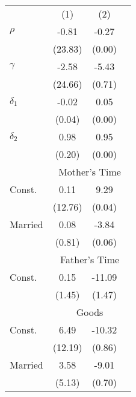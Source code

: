 \begin{tabular}{lccc}\\\toprule
&(1)&(2)&\\\cmidrule(r){2-4}$\rho$&-0.81&-0.27&\\
&(23.83)&(0.00)&\\
$\gamma$&-2.58&-5.43&\\
&(24.66)&(0.71)&\\
$\delta_{1}$&-0.02&0.05&\\
&(0.04)&(0.00)&\\
$\delta_{2}$&0.98&0.95&\\
&(0.20)&(0.00)&\\
& \multicolumn{3}{c}{Mother's Time}\\\cmidrule(r){2-4}Const.&0.11&9.29&\\
&(12.76)&(0.04)&\\
Married&0.08&-3.84&\\&(0.81)&(0.06)&\\& \multicolumn{3}{c}{Father's Time}\\\cmidrule(r){2-4}Const.&0.15&-11.09&\\
&(1.45)&(1.47)&\\
& \multicolumn{3}{c}{Goods}\\\cmidrule(r){2-4}Const.&6.49&-10.32&\\
&(12.19)&(0.86)&\\
Married&3.58&-9.01&\\&(5.13)&(0.70)&\\\bottomrule\end{tabular}